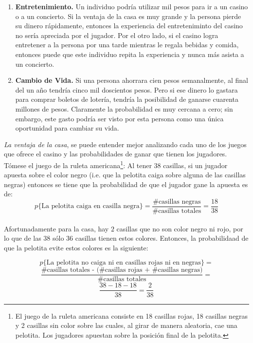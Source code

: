 \begin{enumerate}
	\item \textbf{Entretenimiento.} Un individuo podría utilizar mil pesos para ir a un casino o a un concierto. Si la ventaja de la casa es muy grande y la persona pierde su dinero rápidamente, entonces la experiencia del entreteniminto del casino no sería apreciada por el jugador. Por el otro lado, si el casino logra entretener a la persona por una tarde mientras le regala bebidas y comida, entonces puede que este individuo repita la experiencia y nunca más asista a un concierto.
	\item \textbf{Cambio de Vida.} Si una persona ahorrara cien pesos semanalmente, al final del un año tendría cinco mil doscientos pesos. Pero si ese dinero lo gastara para comprar boletos de lotería, tendría la posibilidad de ganarse cuarenta millones de pesos. Claramente la probabilidad es muy cercana a cero; sin embargo, este gasto podría ser visto por esta persona como una única oportunidad para cambiar su vida.

\end{enumerate}

\emph{La ventaja de la casa}, se puede entender mejor analizando cada uno de los juegos que ofrece el casino y las probabilidades de ganar que tienen los jugadores. Tómese el juego de la ruleta americana\footnote{El juego de la ruleta americana consiste en 18 casillas rojas, 18 casillas negras y 2 casillas sin color sobre las cuales, al girar de manera aleatoria, cae una pelotita. Los jugadores apuestan sobre la posición final de la pelotita.}:
Al tener $38$ casillas, si un jugador apuesta sobre el color negro (i.e. que la pelotita caiga sobre alguna de las casillas negras) entonces se tiene que la probabilidad de que el jugador gane la apuesta es de:\\
\[p\{\text{La pelotita caiga en casilla negra}\} = \frac{\text{\# casillas negras}}{ \text{\# casillas totales}}  = \frac{18}{38}\]\\

Afortunadamente para la casa, hay $2$ casillas que no son color negro ni rojo, por lo que de las $38$ sólo $36$ casillas tienen estos colores. Entonces, la probabilidaad de que la pelotita evite estos colores es la siguiente:

\[p\{\text{La pelotita no caiga ni en casillas rojas ni en negras}\} =\] 
\[\frac{\text{\# casillas totales - (\# casillas rojas + \# casillas negras)}}{ \text{\# casillas totales}}  =\]
\[\frac{38-18-18}{38} = \frac{2}{38}  \]

